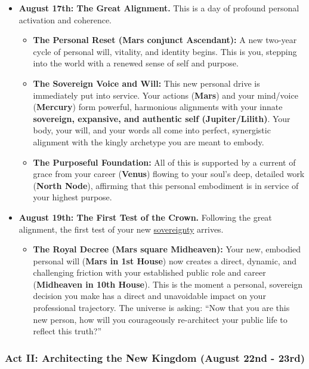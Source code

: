 \documentclass{article}
\begin{document}
\begin{itemize}
\tightlist
\item
  \textbf{August 17th: The Great Alignment.} This is a day of profound personal activation and coherence.

  \begin{itemize}
  \tightlist
  \item
    \textbf{The Personal Reset (Mars conjunct Ascendant):} A new two-year cycle of personal will, vitality, and identity begins. This is you, stepping into the world with a renewed sense of self and purpose.
  \item
    \textbf{The Sovereign Voice and Will:} This new personal drive is immediately put into service. Your actions (\textbf{Mars}) and your mind/voice (\textbf{Mercury}) form powerful, harmonious alignments with your innate \textbf{sovereign, expansive, and authentic self (Jupiter/Lilith)}. Your body, your will, and your words all come into perfect, synergistic alignment with the kingly archetype you are meant to embody.
  \item
    \textbf{The Purposeful Foundation:} All of this is supported by a current of grace from your career (\textbf{Venus}) flowing to your soul's deep, detailed work (\textbf{North Node}), affirming that this personal embodiment is in service of your highest purpose.
  \end{itemize}
\item
  \textbf{August 19th: The First Test of the Crown.} Following the great alignment, the first test of your new \hyperlink{gloss:sovereignty}{sovereignty} arrives.

  \begin{itemize}
  \tightlist
  \item
    \textbf{The Royal Decree (Mars square Midheaven):} Your new, embodied personal will (\textbf{Mars in 1st House}) now creates a direct, dynamic, and challenging friction with your established public role and career (\textbf{Midheaven in 10th House}). This is the moment a personal, sovereign decision you make has a direct and unavoidable impact on your professional trajectory. The universe is asking: ``Now that you are this new person, how will you courageously re-architect your public life to reflect this truth?''
  \end{itemize}
\end{itemize}

\subsubsection*{Act II: Architecting the New Kingdom (August 22nd - 23rd)}\label{act-ii-architecting-the-new-kingdom-august-22nd---23rd}
\end{document}
